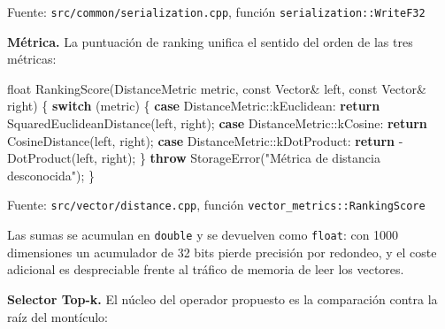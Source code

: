 \documentclass[11pt,a4paper]{article}
\newenvironment{Shaded}{}{}
\newcommand{\AttributeTok}[1]{\textcolor[rgb]{0.49,0.56,0.16}{#1}}
\newcommand{\ControlFlowTok}[1]{\textcolor[rgb]{0.00,0.44,0.13}{\textbf{#1}}}
\newcommand{\DataTypeTok}[1]{\textcolor[rgb]{0.56,0.13,0.00}{#1}}
\newcommand{\NormalTok}[1]{#1}
\newcommand{\OperatorTok}[1]{\textcolor[rgb]{0.40,0.40,0.40}{#1}}
\newcommand{\StringTok}[1]{\textcolor[rgb]{0.25,0.44,0.63}{#1}}
\begin{document}
Fuente: \texttt{src/common/serialization.cpp}, función
\texttt{serialization::WriteF32}

\textbf{Métrica.} La puntuación de ranking unifica el sentido del orden
de las tres métricas:

\begin{Shaded}
\begin{Highlighting}[]
\DataTypeTok{float}\NormalTok{ RankingScore}\OperatorTok{(}\NormalTok{DistanceMetric metric}\OperatorTok{,} \AttributeTok{const}\NormalTok{ Vector}\OperatorTok{\&}\NormalTok{ left}\OperatorTok{,} \AttributeTok{const}\NormalTok{ Vector}\OperatorTok{\&}\NormalTok{ right}\OperatorTok{)} \OperatorTok{\{}
    \ControlFlowTok{switch} \OperatorTok{(}\NormalTok{metric}\OperatorTok{)} \OperatorTok{\{}
        \ControlFlowTok{case}\NormalTok{ DistanceMetric}\OperatorTok{::}\NormalTok{kEuclidean}\OperatorTok{:}
            \ControlFlowTok{return}\NormalTok{ SquaredEuclideanDistance}\OperatorTok{(}\NormalTok{left}\OperatorTok{,}\NormalTok{ right}\OperatorTok{);}
        \ControlFlowTok{case}\NormalTok{ DistanceMetric}\OperatorTok{::}\NormalTok{kCosine}\OperatorTok{:}
            \ControlFlowTok{return}\NormalTok{ CosineDistance}\OperatorTok{(}\NormalTok{left}\OperatorTok{,}\NormalTok{ right}\OperatorTok{);}
        \ControlFlowTok{case}\NormalTok{ DistanceMetric}\OperatorTok{::}\NormalTok{kDotProduct}\OperatorTok{:}
            \ControlFlowTok{return} \OperatorTok{{-}}\NormalTok{DotProduct}\OperatorTok{(}\NormalTok{left}\OperatorTok{,}\NormalTok{ right}\OperatorTok{);}
    \OperatorTok{\}}
    \ControlFlowTok{throw}\NormalTok{ StorageError}\OperatorTok{(}\StringTok{"Métrica de distancia desconocida"}\OperatorTok{);}
\OperatorTok{\}}
\end{Highlighting}
\end{Shaded}

Fuente: \texttt{src/vector/distance.cpp}, función
\texttt{vector\_metrics::RankingScore}

Las sumas se acumulan en \texttt{double} y se devuelven como
\texttt{float}: con 1000 dimensiones un acumulador de 32 bits pierde
precisión por redondeo, y el coste adicional es despreciable frente al
tráfico de memoria de leer los vectores.

\textbf{Selector Top-k.} El núcleo del operador propuesto es la
comparación contra la raíz del montículo:
\end{document}
